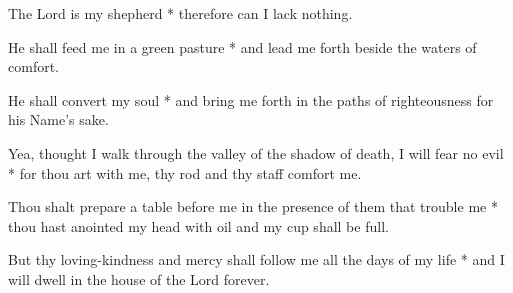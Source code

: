 The Lord is my shepherd * therefore can I lack nothing.

He shall feed me in a green pasture * and lead me forth beside the waters of comfort.

He shall convert my soul * and bring me forth in the paths of righteousness for his Name's sake.

Yea, thought I walk through the valley of the shadow of death, I will fear no evil * for thou art with me, thy rod and thy staff comfort me.

Thou shalt prepare a table before me in the presence of them that trouble me * thou hast anointed my head with oil and my cup shall be full.

But thy loving-kindness and mercy shall follow me all the days of my life * and I will dwell in the house of the Lord forever.